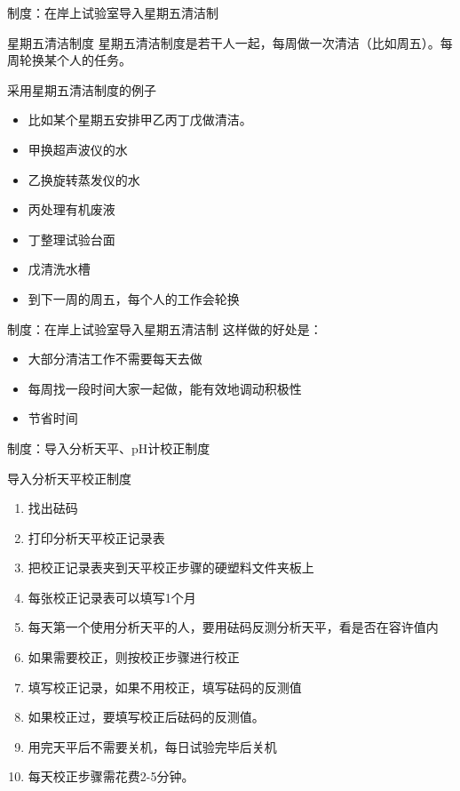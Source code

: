 \documentclass[CJKutf8]{beamer}
\newenvironment{SC}{%
  \CJKfamily{gbsn}%
  \CJKtilde
  \CJKnospace}{}
\begin{document}
\begin{CJK}{UTF8}{}
\begin{SC}
\begin{frame}{制度：在岸上试验室导入星期五清洁制}
  \begin{block}{星期五清洁制度}
  星期五清洁制度是若干人一起，每周做一次清洁（比如周五）。每周轮换某个人的任务。
  \end{block}
  \begin{exampleblock}{采用星期五清洁制度的例子}
    \begin{itemize}
    \item 比如某个星期五安排甲乙丙丁戊做清洁。

    \item 甲换超声波仪的水

    \item 乙换旋转蒸发仪的水

    \item 丙处理有机废液

    \item 丁整理试验台面

    \item 戊清洗水槽

    \item 到下一周的周五，每个人的工作会轮换
    \end{itemize}
  \end{exampleblock}
\end{frame}

\begin{frame}{制度：在岸上试验室导入星期五清洁制}
这样做的好处是：
  \begin{itemize}
  \item 大部分清洁工作不需要每天去做
  \pause
  \item 每周找一段时间大家一起做，能有效地调动积极性
  \pause
  \item 节省时间
  \end{itemize}
\end{frame}

\begin{frame}{制度：导入分析天平、pH计校正制度}
  \begin{block}{导入分析天平校正制度}
    \begin{enumerate}
    \item 找出砝码
    \item 打印分析天平校正记录表
    \item 把校正记录表夹到天平校正步骤的硬塑料文件夹板上
    \item 每张校正记录表可以填写1个月
    \item 每天第一个使用分析天平的人，要用砝码反测分析天平，看是否在容许值内
    \item 如果需要校正，则按校正步骤进行校正
    \item 填写校正记录，如果不用校正，填写砝码的反测值
    \item 如果校正过，要填写校正后砝码的反测值。
    \item 用完天平后不需要关机，每日试验完毕后关机
    \item 每天校正步骤需花费2-5分钟。
    \end{enumerate}
  \end{block}
\end{frame}


\end{SC}
\end{CJK}
\end{document}
